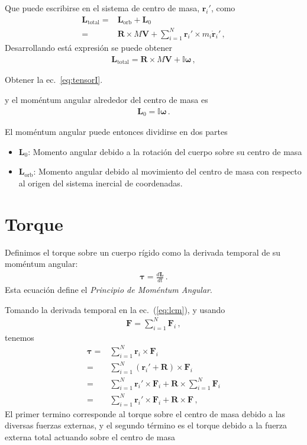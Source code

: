 Que puede escribirse en el sistema de centro de masa, $\mathbf{r}_i'$, como %
\begin{align}
  \label{eq:lcm}
   \mathbf{L}_{\text{total}}=&\mathbf{L}_{\text{orb}}+\mathbf{L}_0\nonumber\\
   =&\mathbf{R}\times M\mathbf{V}+\sum_{i=1}^N \mathbf{r}_i'\times m_i\dot{\mathbf{r}}_i'\,,
\end{align}
Desarrollando está expresión se puede obtener
\begin{align}
  \label{eq:tensorI}
  \mathbf{L}_{\text{total}}=\mathbf{R}\times M\mathbf{V}+\mathbb{I}\boldsymbol{\omega}\,,
\end{align}

\ejercicio{}Obtener la ec.~\eqref{eq:tensorI}.


y el moméntum angular alrededor del centro de masa es
\begin{align}
  \mathbf{L}_0=\mathbb{I}\boldsymbol{\omega}\,.
\end{align}

El moméntum angular puede entonces dividirse en dos partes
\begin{itemize}
\item $\mathbf{L}_0$: Momento angular debido a la rotación del cuerpo sobre su centro de masa
\item $\mathbf{L}_{\text{orb}}$: Momento angular debido al movimiento del centro de masa con respecto al origen del sistema inercial de coordenadas.
\end{itemize}


\section{Torque}

Definimos el torque sobre un cuerpo rígido como la derivada temporal de su moméntum angular:
\begin{align}
  \label{eq:torque}
  \boldsymbol{\tau}=\frac{d\mathbf{L}}{dt}\,.
\end{align}
Esta ecuación define el \emph{Principio de Moméntum Angular}. 

Tomando la derivada temporal en la ec.~(\ref{eq:lcm}), y usando
\begin{align}
  \mathbf{F}=\sum_{i=1}^N\mathbf{F}_i\,,
\end{align}
tenemos
\begin{align}
  \boldsymbol{\tau}=&\sum_{i=1}^N\mathbf{r}_i\times \mathbf{F}_i\nonumber\\
=&\sum_{i=1}^N\left(\mathbf{r}_i'+\mathbf{R}\right)\times \mathbf{F}_i\nonumber\\
=&\sum_{i=1}^N\mathbf{r}_i'\times \mathbf{F}_i+\mathbf{R}\times \sum_{i=1}^N\mathbf{F}_i\nonumber\\
=&\sum_{i=1}^N\mathbf{r}_i'\times \mathbf{F}_i+\mathbf{R}\times\mathbf{F}\,,
\end{align}
El primer termino corresponde al torque sobre el centro de masa debido a las diversas fuerzas externas, y el segundo término es el torque debido a la fuerza externa total actuando sobre el centro de masa

